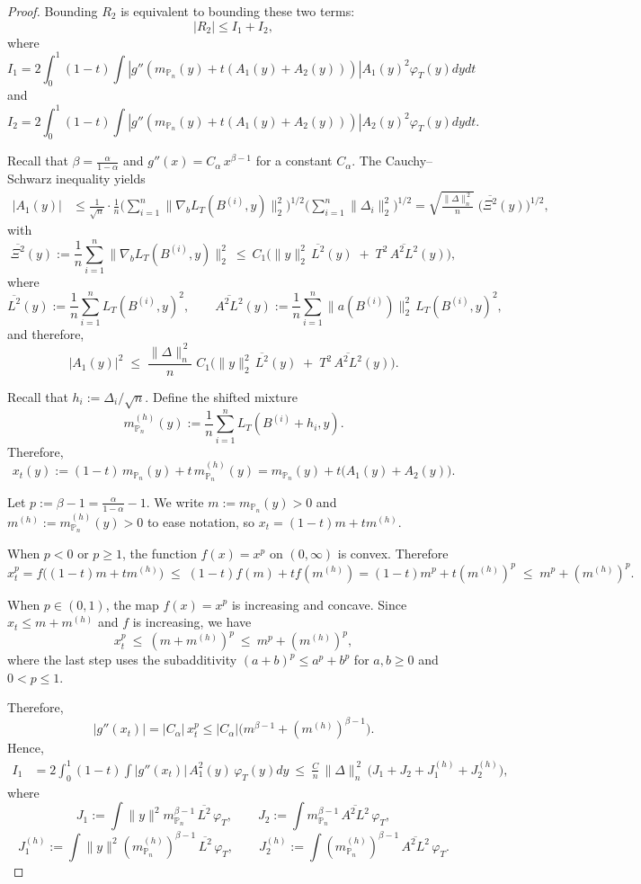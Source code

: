 \documentclass[11pt]{article}
\theoremstyle{definition}
\begin{document}
\begin{proof}
Bounding $R_2$ is equivalent to bounding these two terms:
$$|R_2| \leq I_1 + I_2,$$
where 
$$I_1 = 2\int_0^1 (1-t)\int \left|g''(m_{\mathbb{P}_n}(y) + t(A_1(y) + A_2(y)))\right|A_1(y)^2\varphi_T(y)dydt$$and 
$$I_2 = 2\int_0^1 (1-t)\int\left| g''(m_{\mathbb{P}_n}(y) + t(A_1(y) + A_2(y)))\right|A_2(y)^2\varphi_T(y)dydt.$$  

Recall that $\beta = \frac{\alpha}{1-\alpha}$ and $g''(x)=C_\alpha\,x^{\beta-1}$ for a constant $C_{\alpha}$. The {Cauchy--Schwarz inequality} yields
\begin{align*}
|A_1(y)|
&\le \frac{1}{\sqrt n}\cdot\frac{1}{n}\Big(\sum_{i=1}^n \|\nabla_b L_T(B^{(i)},y)\|_2^2\Big)^{\!1/2}\!
\Big(\sum_{i=1}^n \|\Delta_i\|_2^2\Big)^{\!1/2}
= \sqrt{\frac{\|\Delta\|_n^{\,2}}{n}}\;\Big(\overline{\Xi^2}(y)\Big)^{\!1/2},
\end{align*}
with
\[
\overline{\Xi^2}(y):=\frac{1}{n}\sum_{i=1}^n \|\nabla_b L_T(B^{(i)},y)\|_2^2
\ \le\ C_1\Big(\|y\|_2^2\,\overline{L^2}(y)\;+\;T^2\,\overline{A^2L^2}(y)\Big),
\]
where
\[
\overline{L^2}(y):=\frac1n\sum_{i=1}^n L_T(B^{(i)},y)^2,\qquad
\overline{A^2L^2}(y):=\frac1n\sum_{i=1}^n \|a(B^{(i)})\|_2^2\,L_T(B^{(i)},y)^2,
\]
and therefore, 
$$|A_1(y)|^2 \;\le\; \frac{\|\Delta\|_n^{\,2}}{n}\;C_1\Big(\|y\|_2^2\,\overline{L^2}(y)\;+\;T^2\,\overline{A^2L^2}(y)\Big).$$

Recall that $h_i:=\Delta_i/\sqrt n$. Define the shifted mixture
\[
m_{\mathbb{P}_n}^{(h)}(y):=\frac1n\sum_{i=1}^n L_T(B^{(i)}+h_i,y).
\]
Therefore, 
\[
x_t(y):=(1-t)\,m_{\mathbb{P}_n}(y)+t\,m_{\mathbb{P}_n}^{(h)}(y)
=m_{\mathbb{P}_n}(y)+t\big(A_1(y)+A_2(y)\big).
\]

Let $p:=\beta-1 = \frac{\alpha}{1-\alpha} - 1$. 
We write $m:=m_{\mathbb{P}_n}(y)>0$ and $m^{(h)}:=m_{\mathbb{P}_n}^{(h)}(y)>0$ to ease notation, so
$x_t=(1-t)m+t m^{(h)}$.

When $p < 0$ or $p \geq 1$,
the function $f(x)=x^{p}$ on $(0,\infty)$ is convex. Therefore
\[
x_t^{p}=f\big((1-t)m+t m^{(h)}\big)
\;\le\; (1-t)f(m)+t f(m^{(h)})=(1-t)m^{p}+t (m^{(h)})^{p}
\;\le\; m^{p}+(m^{(h)})^{p}.
\]

When $p \in (0,1)$, the map $f(x)=x^{p}$ is increasing and concave. Since $x_t\le m+m^{(h)}$ and $f$ is increasing, we have
\[
x_t^{p}\ \le\ (m+m^{(h)})^{p}\ \le\ m^{p}+(m^{(h)})^{p},
\]
where the last step uses the subadditivity $(a+b)^{p}\le a^{p}+b^{p}$ for $a,b\ge0$ and $0<p\le1$.

Therefore, $$|g''(x_t)|=|C_\alpha|\,x_t^p \le |C_\alpha|\big(m^{\beta-1}+(m^{(h)})^{\beta-1}\big).$$
Hence, 
\begin{align*}
I_1
&=2\!\int_0^1(1-t)\!\int |g''(x_t)|\,A_1^2(y)\,\varphi_T(y)dy
\ \le\ \frac{C}{n}\,\|\Delta\|_n^{\,2}\,\Big(J_1+J_2+J_1^{(h)}+J_2^{(h)}\Big),
\end{align*}
where
\[
J_1:=\int \|y\|^2 m_{\mathbb{P}_n}^{\beta-1}\,\overline{L^2}\,\varphi_T,\qquad
J_2:=\int m_{\mathbb{P}_n}^{\beta-1}\,\overline{A^2L^2}\,\varphi_T,
\]
\[
J_1^{(h)}:=\int \|y\|^2 (m_{\mathbb{P}_n}^{(h)})^{\beta-1}\,\overline{L^2}\,\varphi_T,\qquad
J_2^{(h)}:=\int (m_{\mathbb{P}_n}^{(h)})^{\beta-1}\,\overline{A^2L^2}\,\varphi_T.
\]


\end{proof}
\end{document}
